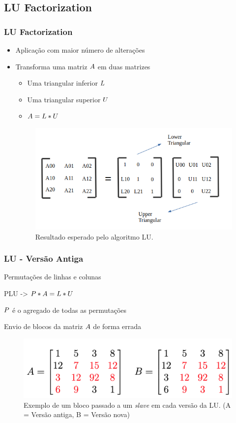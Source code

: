 \documentclass[xcolor={table}]{beamer}
\begin{document}
\subsection{LU Factorization}
\begin{frame}\frametitle{LU Factorization}
    \begin{itemize}
        \item {Aplicação com maior número de alterações}
        \item {Transforma uma matriz $\mathnormal{A}$ em duas matrizes}
        \begin{itemize}
            \item {Uma triangular inferior $\mathnormal{L}$}
            \item {Uma triangular superior $\mathnormal{U}$}
            \item {$\mathnormal{A = L * U}$}
        \end{itemize}
        \begin{figure}
            \centering
            \includegraphics[width=.7\linewidth, keepaspectratio]{figs/matrixluexample.png}
            \caption{Resultado esperado pelo algoritmo LU.}
            \label{lst:matrixluexample}
        \end{figure}
    \end{itemize}
\end{frame}

\begin{frame}\frametitle{LU - Versão Antiga}
    \begin{itemize}
        \item {Permutações de linhas e colunas}
        \item {PLU -> $\mathnormal{P * A = L * U}$
        \item {$\mathnormal{P}$} é o agregado de todas as permutações}
        \item {Envio de blocos da matriz $\mathnormal{A}$ de forma errada}
        \begin{figure}
            \centering
            \includegraphics[width=.7\linewidth, keepaspectratio]{figs/luipcwrong.png}
            \caption{Exemplo de um bloco passado a um \textit{slave} em cada versão da LU. (A = Versão antiga, B = Versão nova)}
            \label{fig:rightandwrongblocks}
        \end{figure}
    \end{itemize}
\end{frame}
\end{document}
